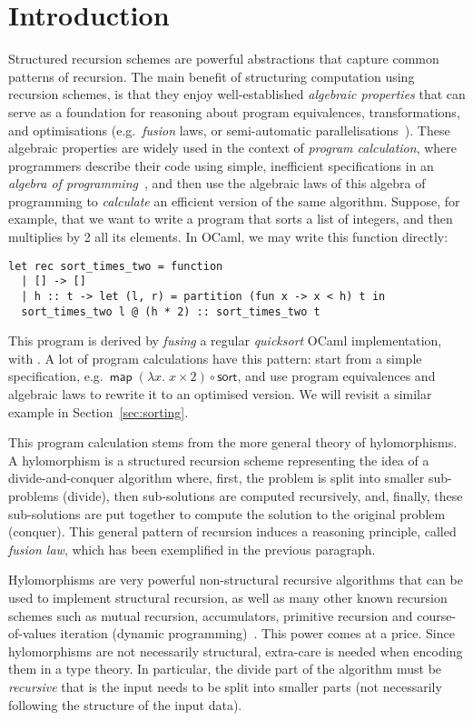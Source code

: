 \documentclass[a4paper,anonymous, UKenglish,cleveref, autoref, thm-restate]{lipics-v2021}
\begin{document}
\section{Introduction}
\label{sec:intro}
Structured recursion schemes are powerful abstractions that capture common
patterns of recursion. The main benefit of structuring computation using
recursion schemes, is that they enjoy well-established \emph{algebraic
properties} that can serve as a foundation for reasoning about program
equivalences, transformations, and optimisations (e.g.\ \emph{fusion} laws, or
semi-automatic
parallelisations~\cite{TakanoM95,Gibbons96:Third,Morihata09:Third,farmsCastro}).
%
These algebraic properties are widely used in the context of \emph{program
calculation}, where programmers describe their code using simple, inefficient
specifications in an \emph{algebra of programming}~\cite{BirddeMoor96:Algebra},
and then use the algebraic laws of this algebra of programming to
\emph{calculate} an efficient version of the same algorithm.
%
Suppose, for example, that we want to write a program that sorts a list of
integers, and then multiplies by 2 all its elements. In OCaml, we may write this
function directly:
\begin{verbatim}
let rec sort_times_two = function
  | [] -> []
  | h :: t -> let (l, r) = partition (fun x -> x < h) t in
  sort_times_two l @ (h * 2) :: sort_times_two t
\end{verbatim}
This program is derived by \emph{fusing} a regular \emph{quicksort} OCaml
implementation, with
.
A lot of program calculations have this pattern: start from a simple
specification, e.g.\ $\mathsf{map}\;(\lambda x.\;x \times 2) \circ
\mathsf{sort}$, and use program equivalences and algebraic laws to rewrite it to
an optimised version. We will revisit a similar example in
Section~\ref{sec:sorting}.

This program calculation stems from the more general theory of hylomorphisms.  A
hylomorphism is a structured recursion scheme representing the idea of a
divide-and-conquer algorithm where, first, the problem is split into smaller
sub-problems (divide), then sub-solutions are computed recursively, and, finally,
these sub-solutions are put together to compute the solution to the original
problem (conquer).  This general pattern of recursion induces a reasoning
principle, called \emph{fusion law}, which has been exemplified in the previous
paragraph.

Hylomorphisms are very powerful non-structural recursive algorithms that can be
used to implement structural recursion, as well as many other known recursion
schemes such as mutual recursion, accumulators, primitive recursion and
course-of-values iteration (dynamic programming)~\cite{HinzeWG15}. This power
comes at a price. Since hylomorphisms are not necessarily structural, extra-care
is needed when encoding them in a type theory. In particular, the divide part of
the algorithm must be \emph{recursive} that is the input needs to be split into
smaller parts (not necessarily following the structure of the input data).
\end{document}
